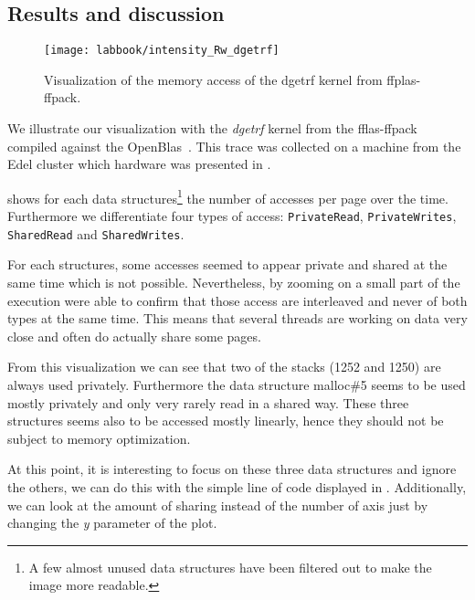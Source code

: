 \subsection{Results and discussion}

\begin{figure}[htb]
    \centering
    \texttt{[image: labbook/intensity\_Rw\_dgetrf]}
    \caption{Visualization of the memory access of the dgetrf kernel from ffplas-ffpack.}
    \label{fig:dgetrf-intensity}
\end{figure}

We illustrate our visualization with the \emph{dgetrf} kernel from the fflas-ffpack~\cite{group16FFLASFFPACK} compiled against the OpenBlas~\cite{Chothia16OpenBlas}.
This trace was collected on a machine from the Edel cluster which hardware was presented in .

 shows for each data structures\footnote{
    A few almost unused data structures have been filtered out to make the image more readable.}
    the number of accesses per page over the time.
Furthermore we differentiate four types of access: \texttt{PrivateRead}, \texttt{PrivateWrites}, \texttt{SharedRead} and \texttt{SharedWrites}.

For each structures, some accesses seemed to appear private and shared at the same time which is not possible.
Nevertheless, by zooming on a small part of the execution were able to confirm that those access are interleaved and never of both types at the same time.
This means that several threads are working on data very close and often do actually share some pages.

From this visualization we can see that two of the stacks (1252 and 1250) are always used privately.
Furthermore the data structure malloc\#5 seems to be used mostly privately and only very rarely read in a shared way.
These three structures seems also to be accessed mostly linearly, hence they should not be subject to memory optimization.



At this point, it is interesting to focus on these three data structures and ignore the others, we can do this with the simple line of code displayed in .
Additionally, we can look at the amount of sharing instead of the number of axis just by changing the \emph{y} parameter of the plot.

